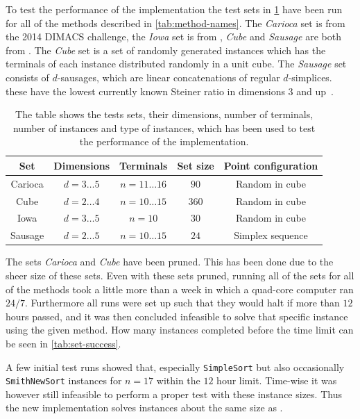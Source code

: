 To test the performance of the implementation the test sets in
\cref{tab:test-sets} have been run for all of the methods described in
\cref{tab:method-names}. The \textit{Carioca} set is from the 2014 DIMACS
challenge, the \textit{Iowa} set is from \textcite{fampa2008}, \textit{Cube} and
\textit{Sausage} are both from \textcite{fonseca2014}. The \textit{Cube} set is
a set of randomly generated instances which has the terminals of each instance
distributed randomly in a unit cube. The \textit{Sausage} set consists of
$d$-sausages, which are linear concatenations of regular $d$-simplices. these
have the lowest currently known Steiner ratio in dimensions $3$ and
up~\cite{smith1995}.

\begin{table}[htbp]
  \centering
  \begin{tabular}{ccccc}
    \toprule
    Set     & Dimensions       & Terminals             & Set size & Point configuration \\
    \midrule
    Carioca & $d = 3 \ldots 5$ & $n = 11 \ldots 16$    & $90$     & Random in cube      \\
    Cube    & $d = 2 \ldots 4$ & $n = 10 \ldots 15$    & $360$    & Random in cube      \\
    Iowa  & $d = 3 \ldots 5$ & $n = 10$              & $30$     & Random in cube      \\
    Sausage & $d = 2 \ldots 5$ & $n = 10 \ldots 15$    & $24$     & Simplex sequence    \\
    \bottomrule
  \end{tabular}
  \caption[Test sets used to test performance]{The table shows the tests sets,
    their dimensions, number of terminals, number of instances and type of instances,
    which has been used to test the performance of the implementation.\label{tab:test-sets}}
\end{table}

The sets \textit{Carioca} and \textit{Cube} have been pruned. This has been done
due to the sheer size of these sets. Even with these sets pruned, running all of
the sets for all of the methods took a little more than a week in which a
quad-core computer ran $24/7$. Furthermore all runs were set up such that
they would halt if more than $12$ hours passed, and it was then concluded
infeasible to solve that specific instance using the given method. How many
instances completed before the time limit can be seen in \cref{tab:set-success}.

A few initial test runs showed that, especially \texttt{SimpleSort} but also
occasionally \texttt{SmithNewSort} instances for $n=17$ within the $12$ hour
limit. Time-wise it was however still infeasible to perform a proper test with
these instance sizes. Thus the new implementation solves instances about the
same size as \textcite{fonseca2014}.

